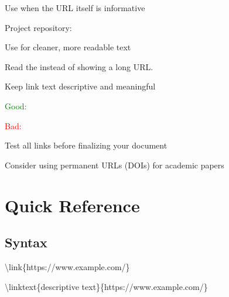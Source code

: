 \documentclass{template_pid}
\begin{document}
\begin{enumeration}
    \item Use  when the URL itself is informative
    \begin{example}
    Project repository: 
    \end{example}

    \item Use  for cleaner, more readable text
    \begin{example}
    Read the 
    instead of showing a long URL.
    \end{example}

    \item Keep link text descriptive and meaningful
    \begin{bulletlist}
        \item \textcolor{green}{Good:} 
        \item \textcolor{red}{Bad:} 
    \end{bulletlist}

    \item Test all links before finalizing your document

    \item Consider using permanent URLs (DOIs) for academic papers
    \begin{example}
    \end{example}
\end{enumeration}

\section{Quick Reference}

\subsection{Syntax}

\begin{codeblock}
\textbackslash link\{https://www.example.com/\}

\textbackslash linktext\{descriptive text\}\{https://www.example.com/\}
\end{codeblock}
\end{document}

